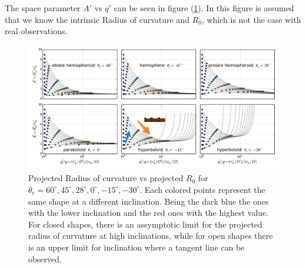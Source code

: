 The space parameter $A'$ vs $q'$ can be seen in figure (\ref{fig:Apqp}). In this figure is assumed that we know the intrinsic Radius of curvature and $R_0$, which is not the case with
real observations.


\begin{figure}
\includegraphics[width=0.9\linewidth]{annotated}
\caption{Projected Radius of curvature vs projected $R_0$ for $\theta_c=60^\circ,45^\circ,28^\circ, 0^\circ,-15^\circ,-30^\circ$. Each colored points represent
the same shape at a different inclination. Being the dark blue the ones with the lower inclination and the red ones with the highest value. For closed shapes, there is
an assymptotic limit for the projected radius of curvature at high inclinations, while for open shapes there is an upper limit for inclination where a tangent line can be observed.}
\label{fig:Apqp}
\end{figure}


 

